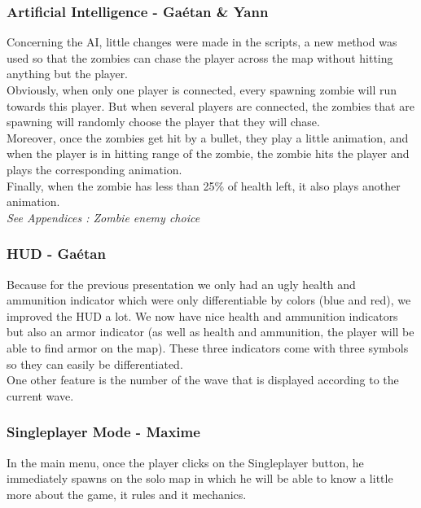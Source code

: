 \documentclass[12pt]{article}
\begin{document}
	\subsubsection{Artificial Intelligence - Ga\'etan \& Yann}
    	Concerning the AI, little changes were made in the scripts, a new method was used so that the zombies can chase the player across the map without hitting anything but the player.\\
        
        Obviously, when only one player is connected, every spawning zombie will run towards this player. But when several players are connected, the zombies that are spawning will randomly choose the player that they will chase.\\
        
        Moreover, once the zombies get hit by a bullet, they play a little animation, and when the player is in hitting range of the zombie, the zombie hits the player and plays the corresponding animation.\\
        
        Finally, when the zombie has less than 25\% of health left, it also plays another animation.\\
\textit{See Appendices : Zombie enemy choice}
\bigskip
    \subsubsection{HUD - Ga\'etan}
    
    	Because for the previous presentation we only had an ugly health and ammunition indicator which were only differentiable by colors (blue and red), we improved the HUD a lot. We now have nice health and ammunition indicators but also an armor indicator (as well as health and ammunition, the player will be able to find armor on the map). These three indicators come with three symbols so they can easily be differentiated.\\
        
        One other feature is the number of the  wave that is displayed according to the current wave.
\bigskip
    \subsubsection{Singleplayer Mode - Maxime}
    
    	In the main menu, once the player clicks on the \guillemotleft \space Singleplayer \guillemotright \space button, he immediately spawns on the solo map in which he will be able to know a little more about the game, it rules and it mechanics.
        
\end{document}
